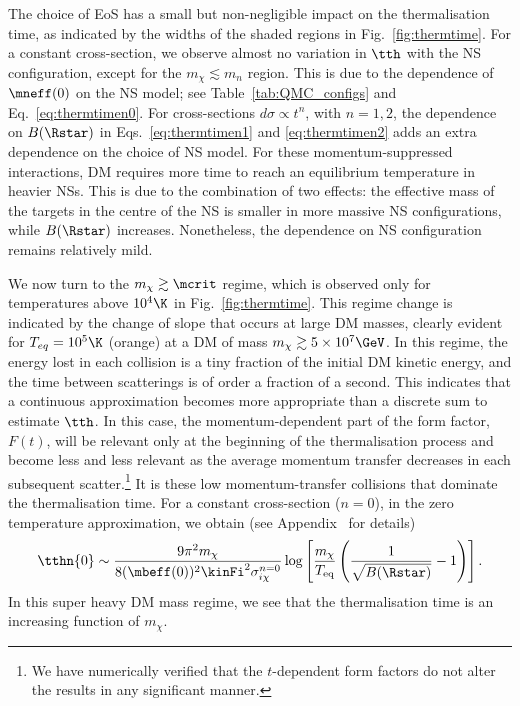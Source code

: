 The choice of EoS has a small but non-negligible impact on the thermalisation time, as indicated by the widths of the shaded regions in Fig.~\ref{fig:thermtime}. 
For a constant cross-section, we observe almost no variation in $\tth$ with the NS configuration, except for the $m_\chi \lesssim m_n$ region. This is due to the dependence of $\mneff(0)$ on the NS model; see Table~\ref{tab:QMC_configs} and Eq.~\ref{eq:thermtimen0}.
For cross-sections $d\sigma\propto t^n$, with $n=1,2$, the dependence on $B(\Rstar)$ in Eqs.~\ref{eq:thermtimen1} and \ref{eq:thermtimen2} adds an extra dependence on the choice of NS model. For these momentum-suppressed interactions, DM requires more time to reach an equilibrium temperature in heavier NSs. This is due to the combination of two effects: the effective mass of the targets in the centre of the NS is smaller in more massive NS configurations, while $B(\Rstar)$ increases. Nonetheless, the dependence on NS configuration remains relatively mild. 




We now turn to the $m_\chi \gtrsim \mcrit$ regime, which is observed only for temperatures above $10^4\K$ in Fig.~\ref{fig:thermtime}. This regime change is indicated by the change of slope that occurs at large DM masses, clearly evident for  $T_{eq}=10^5\K$ (orange)  at a DM of mass $m_\chi\gtrsim5\times10^7\GeV$.  
In this regime, the energy lost in each collision is a tiny fraction of the initial DM kinetic energy, and the time between scatterings is of order a fraction of a second. This indicates that a continuous approximation becomes more appropriate than a discrete sum to estimate $\tth$.
In this case, the momentum-dependent part of the form factor, $F(t)$, will be relevant only at the beginning of the thermalisation process and become less and less relevant as the average momentum transfer decreases in each subsequent scatter.\footnote{We have numerically verified that the $t$-dependent form factors do not alter the results in any significant manner.} It is these low momentum-transfer collisions that dominate the thermalisation time.
%
For a constant cross-section ($n=0$), in the zero temperature approximation, we obtain 
(see Appendix~ for details)
\begin{equation}
    \tthn{0} \sim \frac{9 \pi^2 m_\chi}{8 (\mbeff(0))^2 \kinFi^2 \sigma_{i\chi}^{n=0} }\log\left[\frac{m_\chi}{T_{\rm eq}}\left(\frac{1}{\sqrt{B(\Rstar)}}-1\right)\right]. %
\label{eq:tthemheavy0text}
\end{equation}
In this super heavy DM mass regime, we see that the thermalisation time is an increasing function of $m_\chi$. 



